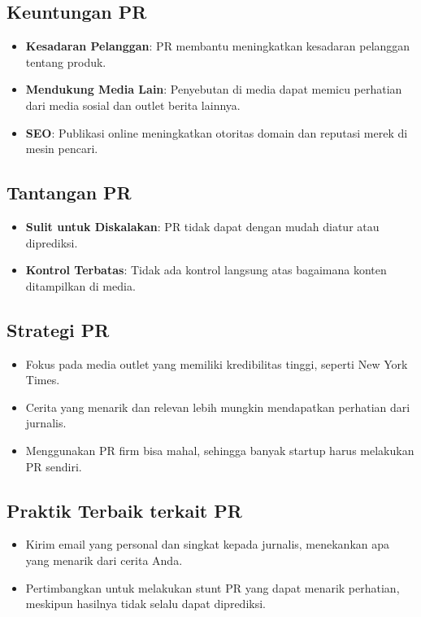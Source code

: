 \documentclass{article}
\begin{document}
\subsection{Keuntungan PR}
\begin{itemize}
    \item \textbf{Kesadaran Pelanggan}: PR membantu meningkatkan kesadaran pelanggan tentang produk.
    \item \textbf{Mendukung Media Lain}: Penyebutan di media dapat memicu perhatian dari media sosial dan outlet berita lainnya.
    \item \textbf{SEO}: Publikasi online meningkatkan otoritas domain dan reputasi merek di mesin pencari.
\end{itemize}

\subsection{Tantangan PR}
\begin{itemize}
    \item \textbf{Sulit untuk Diskalakan}: PR tidak dapat dengan mudah diatur atau diprediksi.
    \item \textbf{Kontrol Terbatas}: Tidak ada kontrol langsung atas bagaimana konten ditampilkan di media.
\end{itemize}

\subsection{Strategi PR}
\begin{itemize}
    \item Fokus pada media outlet yang memiliki kredibilitas tinggi, seperti New York Times.
    \item Cerita yang menarik dan relevan lebih mungkin mendapatkan perhatian dari jurnalis.
    \item Menggunakan PR firm bisa mahal, sehingga banyak startup harus melakukan PR sendiri.
\end{itemize}

\subsection{Praktik Terbaik terkait PR}
\begin{itemize}
    \item Kirim email yang personal dan singkat kepada jurnalis, menekankan apa yang menarik dari cerita Anda.
    \item Pertimbangkan untuk melakukan stunt PR yang dapat menarik perhatian, meskipun hasilnya tidak selalu dapat diprediksi.
\end{itemize}
\newpage
\end{document}
